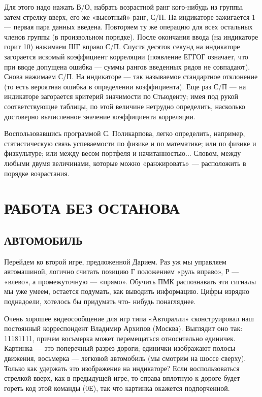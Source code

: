 \documentclass[11pt,a4paper,oneside]{article}
\begin{document}
Для этого надо нажать В/О, набрать возрастной ранг кого-нибудь из группы, затем стрелку вверх, его же «высотный» ранг, С/П. На индикаторе зажигается 1 — первая пара данных введена. Повторяем ту же операцию для всех остальных членов группы (в произвольном порядке). После окончания ввода (на индикаторе горит 10) нажимаем ШГ вправо С/П. Спустя десяток секунд на индикаторе загорается искомый коэффициент корреляции (появление ЕГГОГ означает, что при вводе допущена ошибка — суммы рангов введенных рядов не совпадают). Снова нажимаем С/П. На индикаторе — так называемое стандартное отклонение (то есть вероятная ошибка в определении коэффициента). Еще раз С/П — на индикаторе загорается критерий значимости по Стьюденту; имея под рукой соответствующие таблицы, по этой величине нетрудно определить, насколько достоверно вычисленное значение коэффициента корреляции.

Воспользовавшись программой С. Поликарпова, легко определить, например, статистическую связь успеваемости по физике и по математике; или по физике и физкультуре; или между весом портфеля и начитанностью... Словом, между любыми двумя величинами, которые можно «ранжировать» — расположить в порядке возрастания.

\section{РАБОТА БЕЗ ОСТАНОВА}

\subsection{АВТОМОБИЛЬ}
Перейдем ко второй игре, предложенной Дарием. Раз уж мы управляем автомашиной, логично считать позицию Г положением «руль вправо», Р — «влево», а промежуточную — «прямо». Обучить ПМК распознавать эти сигналы мы уже умеем, остается подумать, как выводить информацию. Цифры изрядно поднадоели, хотелось бы придумать что- нибудь понагляднее.

Очень хорошее видеосообщение для игр типа «Авторалли» сконструировал наш постоянный корреспондент Владимир Архипов (Москва). Выглядит оно так: 11181111, причем восьмерка может перемещаться относительно единичек. Картинка — это поперечный разрез дороги; единички изображают полосы движения, восьмерка — легковой автомобиль (мы смотрим на шоссе сверху). Только как удержать это изображение на индикаторе? Если воспользоваться стрелкой вверх, как в предыдущей игре, то справа вплотную к дороге будет гореть код этой команды (0Е), так что картинка окажется подпорченной.
\end{document}
